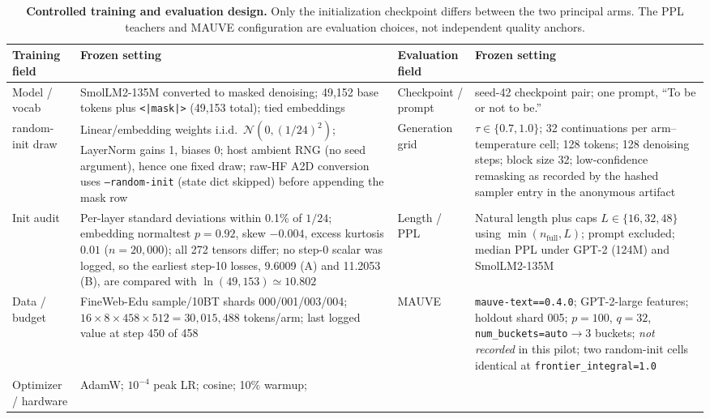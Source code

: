 \documentclass{article}
\newcommand{\armB}{random-init}
\begin{document}
\begin{table}[!t]
  \caption{\textbf{Controlled training and evaluation design.}  Only the
  initialization checkpoint differs between the two principal arms.  The PPL
  teachers and MAUVE configuration are evaluation choices, not independent
  quality anchors.}
  \label{tab:design}
  \centering
  \footnotesize
  \setlength{\tabcolsep}{3pt}
  \renewcommand{\arraystretch}{0.94}
  \begin{tabularx}{\textwidth}{@{}L{0.105\textwidth}Y L{0.105\textwidth}Y@{}}
    \toprule
    Training field & Frozen setting & Evaluation field & Frozen setting \\
    \midrule
    Model / vocab & SmolLM2-135M converted to masked denoising; 49{,}152 base
      tokens plus \texttt{<|mask|>} (49{,}153 total); tied embeddings &
    Checkpoint / prompt & seed-42 checkpoint pair; one prompt, ``To be or not to be.'' \\
    \armB{} draw & Linear/embedding weights i.i.d.\
      $\mathcal{N}(0,(1/24)^2)$; LayerNorm gains 1, biases 0; host ambient RNG
      (no seed argument), hence one fixed draw; raw-HF A2D conversion uses
      \texttt{--random-init} (state dict skipped) before appending the mask row &
    Generation grid & $\tau\in\{0.7,1.0\}$; 32 continuations per arm--temperature
      cell; 128 tokens; 128 denoising steps; block size 32; low-confidence remasking
      as recorded by the hashed sampler entry in the anonymous artifact \\
    Init audit & Per-layer standard deviations within 0.1\% of $1/24$;
      embedding normaltest $p=0.92$, skew $-0.004$, excess kurtosis $0.01$
      ($n=20{,}000$); all 272 tensors differ; no step-0 scalar was logged, so
      the earliest step-10 losses, 9.6009 (A) and 11.2053 (B), are compared
      with $\ln(49{,}153)\simeq10.802$ &
    Length / PPL & Natural length plus caps $L\in\{16,32,48\}$ using
      $\min(n_{\mathrm{full}},L)$; prompt excluded; median PPL under GPT-2
      (124M) and SmolLM2-135M \\
    Data / budget & FineWeb-Edu sample/10BT shards 000/001/003/004;
      $16\!\times\!8\!\times\!458\!\times\!512=30{,}015{,}488$ tokens/arm;
      last logged value at step 450 of 458 &
    MAUVE & \texttt{mauve-text==0.4.0}; GPT-2-large features; holdout shard 005;
      $p=100$, $q=32$, \texttt{num\_buckets=auto}$\rightarrow3$ buckets;
      \emph{not recorded}
      in this pilot; two \armB{} cells identical at
      \texttt{frontier\_integral=1.0} \\
    Optimizer / hardware & AdamW; $10^{-4}$ peak LR; cosine; 10\% warmup;

\end{tabularx}
\end{table}
\end{document}
